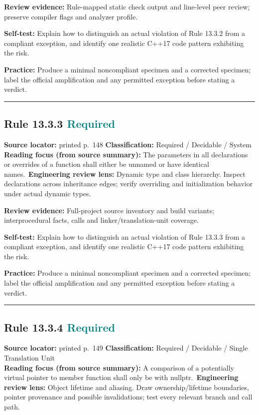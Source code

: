 \documentclass[10pt,letterpaper]{article}
\begin{document}
\textbf{Review evidence:} Rule-mapped static check output and line-level peer review; preserve compiler flags and analyzer profile.

\textbf{Self-test:} Explain how to distinguish an actual violation of Rule 13.3.2 from a compliant exception, and identify one realistic C++17 code pattern exhibiting the risk.\par
\textbf{Practice:} Produce a minimal noncompliant specimen and a corrected specimen; label the official amplification and any permitted exception before stating a verdict.
\smallskip\hrule\smallskip
\subsection*{Rule 13.3.3 \enspace \texorpdfstring{\small\textcolor{teal}{Required}}{Required}}
\noindent\textbf{Source locator:} printed p.~148 \quad\textbf{Classification:} Required / Decidable / System\\
\textbf{Reading focus (from source summary):} The parameters in all declarations or overrides of a function shall either be unnamed or have identical names.\
\textbf{Engineering review lens:} Dynamic type and class hierarchy. Inspect declarations across inheritance edges; verify overriding and initialization behavior under actual dynamic types.

\textbf{Review evidence:} Full-project source inventory and build variants; interprocedural facts, calls and linker/translation-unit coverage.

\textbf{Self-test:} Explain how to distinguish an actual violation of Rule 13.3.3 from a compliant exception, and identify one realistic C++17 code pattern exhibiting the risk.\par
\textbf{Practice:} Produce a minimal noncompliant specimen and a corrected specimen; label the official amplification and any permitted exception before stating a verdict.
\smallskip\hrule\smallskip
\subsection*{Rule 13.3.4 \enspace \texorpdfstring{\small\textcolor{teal}{Required}}{Required}}
\noindent\textbf{Source locator:} printed p.~149 \quad\textbf{Classification:} Required / Decidable / Single Translation Unit\\
\textbf{Reading focus (from source summary):} A comparison of a potentially virtual pointer to member function shall only be with nullptr.\
\textbf{Engineering review lens:} Object lifetime and aliasing. Draw ownership/lifetime boundaries, pointer provenance and possible invalidations; test every relevant branch and call path.
\end{document}

